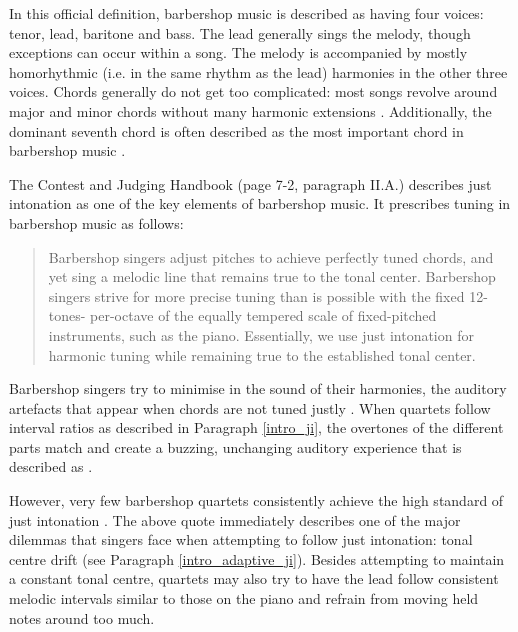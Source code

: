 \documentclass[a4paper]{article}
\begin{document}
In this official definition, barbershop music is described as having four voices: tenor, lead, baritone and bass. The lead generally sings the melody, though exceptions can occur within a song. The melody is accompanied by mostly homorhythmic (i.e. in the same rhythm as the lead) harmonies in the other three voices. Chords generally do not get too complicated: most songs revolve around major and minor chords without many harmonic extensions \cite{barbershop_harmony_society_contest_2022}. Additionally, the dominant seventh chord is often described as the most important chord in barbershop music \cite{averill_bell_1999}.

The Contest and Judging Handbook (page 7-2, paragraph II.A.) \cite{barbershop_harmony_society_contest_2022} describes just intonation as one of the key elements of barbershop music. It prescribes tuning in barbershop music as follows:
\begin{quote}
	Barbershop singers adjust pitches to achieve perfectly tuned chords, and yet sing a melodic line that remains true to the tonal center. Barbershop singers strive for more precise tuning than is possible with the fixed 12-tones- per-octave of the equally tempered scale of fixed-pitched instruments, such as the piano. Essentially, we use just intonation for harmonic tuning while remaining true to the established tonal center.
\end{quote}
Barbershop singers try to minimise  in the sound of their harmonies, the auditory artefacts that appear when chords are not tuned justly \cite{abbott_acoustic_2001}. When quartets follow interval ratios as described in Paragraph \ref{intro_ji}, the overtones of the different parts match and create a buzzing, unchanging auditory experience that is described as .

However, very few barbershop quartets consistently achieve the high standard of just intonation \cite{garnett_ethics_1999}. The above quote immediately describes one of the major dilemmas that singers face when attempting to follow just intonation: tonal centre drift (see Paragraph \ref{intro_adaptive_ji}). Besides attempting to maintain a constant tonal centre, quartets may also try to have the lead follow consistent melodic intervals similar to those on the piano and refrain from moving held notes around too much.
\end{document}
